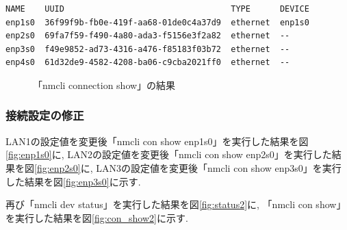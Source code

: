 \documentclass{ltjsarticle} %
\begin{document}
\begin{mdframed}
  \begin{verbatim}
NAME    UUID                                  TYPE      DEVICE
enp1s0  36f99f9b-fb0e-419f-aa68-01de0c4a37d9  ethernet  enp1s0
enp2s0  69fa7f59-f490-4a80-ada3-f5156e3f2a82  ethernet  --
enp3s0  f49e9852-ad73-4316-a476-f85183f03b72  ethernet  --
enp4s0  61d32de9-4582-4208-ba06-c9cba2021ff0  ethernet  --
  \end{verbatim}
  \end{mdframed}
  \begin{figure}[H]
  \caption{「nmcli connection show」の結果}
  \label{fig:con_show}
\end{figure}

\subsubsection{接続設定の修正}
LAN1の設定値を変更後「nmcli con show enp1s0」を実行した結果を図\ref{fig:enp1s0}に, 
LAN2の設定値を変更後「nmcli con show enp2s0」を実行した結果を図\ref{fig:enp2s0}に,  
LAN3の設定値を変更後「nmcli con show enp3s0」を実行した結果を図\ref{fig:enp3s0}に示す. 

再び「nmcli dev status」を実行した結果を図\ref{fig:status2}に, 
「nmcli con show」を実行した結果を図\ref{fig:con_show2}に示す. 
\end{document}
